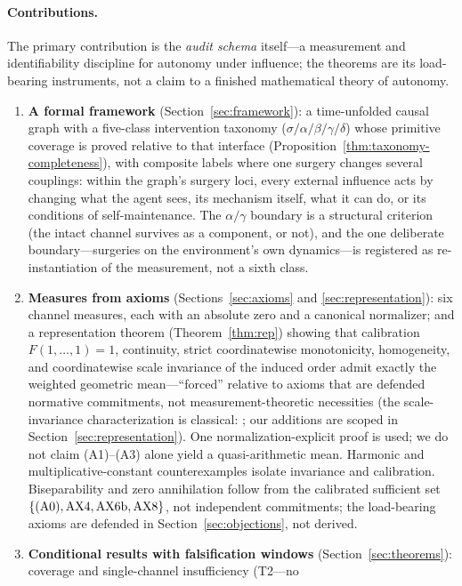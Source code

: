 \paragraph{Contributions.}
The primary contribution is the \emph{audit schema} itself---a measurement
and identifiability discipline for autonomy under influence; the theorems
are its load-bearing instruments, not a claim to a finished mathematical
theory of autonomy.
\begin{enumerate}
\item \textbf{A formal framework} (Section~\ref{sec:framework}): a
time-unfolded causal graph with a five-class intervention taxonomy
($\sigma/\alpha/\beta/\gamma/\delta$) whose primitive coverage is proved
relative to that interface (Proposition~\ref{thm:taxonomy-completeness}),
with composite labels where one surgery changes several couplings:
within the graph's surgery loci, every external influence acts by changing
what the agent sees, its mechanism itself, what it can do, or its conditions
of self-maintenance. The $\alpha/\gamma$ boundary is a structural criterion
(the intact channel survives as a component, or not), and the one deliberate
boundary---surgeries on the environment's own dynamics---is registered as
re-instantiation of the measurement, not a sixth class.
\item \textbf{Measures from axioms} (Sections~\ref{sec:axioms} and
\ref{sec:representation}): six channel measures, each with an absolute zero and
a canonical normalizer; and a representation theorem (Theorem~\ref{thm:rep})
showing that calibration $F(1,\ldots,1)=1$, continuity, strict coordinatewise
monotonicity, homogeneity, and coordinatewise scale invariance of the induced
order admit exactly the weighted geometric mean---``forced'' relative to
axioms that are defended normative commitments, not measurement-theoretic
necessities (the scale-invariance characterization is classical:
\citealp{ebert_welsch2004}; our additions are scoped in
Section~\ref{sec:representation}). One normalization-explicit proof is used;
we do not claim (A1)--(A3) alone yield a quasi-arithmetic mean. Harmonic and
multiplicative-constant counterexamples isolate invariance and calibration.
Biseparability and zero annihilation follow from the calibrated sufficient
set $\{\textup{(A0)},\textup{AX4},\textup{AX6b},\textup{AX8}\}$, not independent
commitments; the load-bearing axioms are defended in
Section~\ref{sec:objections}, not derived.
\item \textbf{Conditional results with falsification windows}
(Section~\ref{sec:theorems}): coverage and single-channel insufficiency (T2---no

\end{enumerate}
